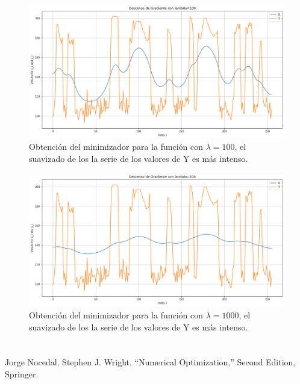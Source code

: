 \documentclass[conference]{IEEEtran}
\begin{document}
\begin{figure}[htbp]
	\centerline{\includegraphics[scale=0.26]{dl100.png}}
	\caption{Obtención del minimizador para la función con $\lambda=100$, el suavizado de los la serie de los valores de Y es más intenso.}
	\label{figdl100}
\end{figure}

\begin{figure}[htbp]
	\centerline{\includegraphics[scale=0.26]{dl1000.png}}
	\caption{Obtención del minimizador para la función con $\lambda=1000$, el suavizado de los la serie de los valores de Y es más intenso.}
	\label{figdl1000}
\end{figure}


\section*{}

\begin{thebibliography}{00}
 Jorge Nocedal, Stephen J. Wright, ``Numerical Optimization,'' Second Edition, Springer.
\end{thebibliography}
\end{document}
